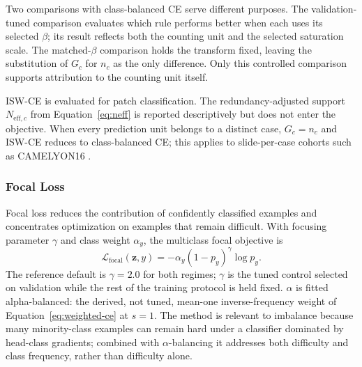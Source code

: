\documentclass[11pt]{article}
\begin{document}
Two comparisons with class-balanced CE serve different purposes. The validation-tuned comparison evaluates which rule performs better when each uses its selected $\beta$; its result reflects both the counting unit and the selected saturation scale. The matched-$\beta$ comparison holds the transform fixed, leaving the substitution of $G_c$ for $n_c$ as the only difference. Only this controlled comparison supports attribution to the counting unit itself.

ISW-CE is evaluated for patch classification. The redundancy-adjusted support $N_{\mathrm{eff},c}$ from Equation~\eqref{eq:neff} is reported descriptively but does not enter the objective. When every prediction unit belongs to a distinct case, $G_c=n_c$ and ISW-CE reduces to class-balanced CE; this applies to slide-per-case cohorts such as CAMELYON16 \citep{queisler2026datasets}.

\subsubsection{Focal Loss}
Focal loss reduces the contribution of confidently classified examples and concentrates optimization on examples that remain difficult. With focusing parameter $\gamma$ and class weight $\alpha_y$, the multiclass focal objective is
\begin{equation}
  \mathcal{L}_{\mathrm{focal}}(\mathbf{z},y) =
  -\alpha_y(1-p_y)^{\gamma}\log p_y.
  \label{eq:focal}
\end{equation}
The reference default is $\gamma=\num{2.0}$ for both regimes; $\gamma$ is the tuned control selected on validation while the rest of the training protocol is held fixed. $\alpha$ is fitted alpha-balanced: the derived, not tuned, mean-one inverse-frequency weight of Equation~\eqref{eq:weighted-ce} at $s=1$. The method is relevant to imbalance because many minority-class examples can remain hard under a classifier dominated by head-class gradients; combined with $\alpha$-balancing it addresses both difficulty and class frequency, rather than difficulty alone.
\end{document}
